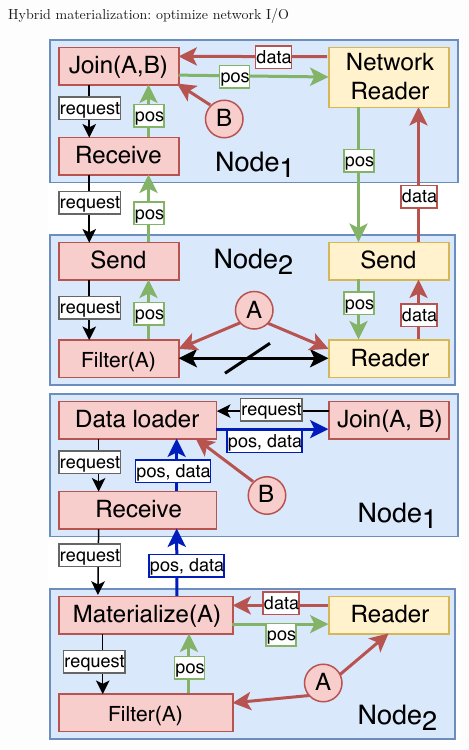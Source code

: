 \documentclass[compress, dvipsnames, unicode]{beamer}
\begin{document}
\begin{frame}{Hybrid materialization: optimize network I/O}
\begin{figure}
    \begin{minipage}[c]{0.475\textwidth}
        \includegraphics[width=\textwidth]{images/pos_pos_data_1.pdf}
    \end{minipage}\hfill
    \begin{minipage}[c]{0.475\textwidth}
        \includegraphics[width=\textwidth]{images/pos_pos_data_3.pdf}
    \end{minipage}
\end{figure}
\end{frame}
\end{document}

